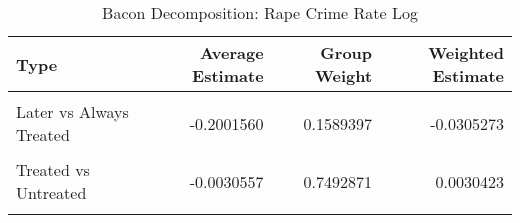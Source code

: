 \begin{table}[H]

\caption{\label{tab:tab:bacondecompositionRape}Bacon Decomposition: Rape Crime Rate Log}
\centering
\begin{tabular}[t]{lrrr}
\toprule
Type & Average Estimate & Group Weight & Weighted Estimate\\
\midrule
\cellcolor{gray!6}{Earlier vs Later Treated} & \cellcolor{gray!6}{-0.0264193} & \cellcolor{gray!6}{0.0683810} & \cellcolor{gray!6}{-0.0026425}\\
Later vs Always Treated & -0.2001560 & 0.1589397 & -0.0305273\\
\cellcolor{gray!6}{Later vs Earlier Treated} & \cellcolor{gray!6}{-0.0106483} & \cellcolor{gray!6}{0.0233921} & \cellcolor{gray!6}{-0.0019283}\\
Treated vs Untreated & -0.0030557 & 0.7492871 & 0.0030423\\
\cellcolor{gray!6}{Total TWFE} & \cellcolor{gray!6}{NaN} & \cellcolor{gray!6}{NaN} & \cellcolor{gray!6}{-0.0320558}\\
\bottomrule
\end{tabular}
\end{table}
